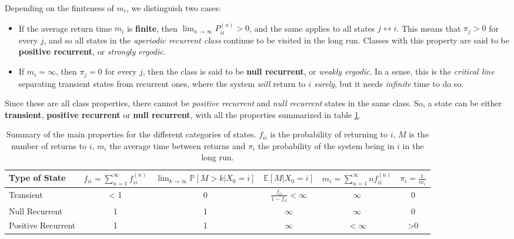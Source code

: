 \documentclass[../template.tex]{subfiles}
\begin{document}
Depending on the finiteness of $m_i$, we distinguish two cases:
\begin{itemize}
    \item If the average return time $m_i$ is \textbf{finite}, then $\lim_{n \to \infty} P_{i i}^{(n)} > 0$, and the same applies to all states $j \leftrightarrow i$. This means that $\pi_j > 0$ for every $j$, and so all states in the \textit{aperiodic recurrent class} continue to be visited in the long run. Classes with this property are said to be \textbf{positive recurrent}, or \textit{strongly ergodic}.
    \item If $m_i = \infty$, then $\pi_j = 0$ for every $j$, then the class is said to be \textbf{null recurrent}, or \textit{weakly ergodic}. In a sense, this is the \textit{critical line} separating transient states from recurrent ones, where the system \textit{will} return to $i$ \textit{surely}, but it needs \textit{infinite} time to do so.        
\end{itemize}
Since these are all class properties, there cannot be \textit{positive recurrent} and \textit{null recurrent} states in the same class. So, a state can be either \textbf{transient}, \textbf{positive recurrent} or \textbf{null recurrent}, with all the properties summarized in table \ref{tab:state-classification}.


\begin{table}[hbp]
    \begin{adjustwidth}{-5em}{-10em}
        \begin{center}
            \begin{tabular}{@{}lccccc@{}}
                \toprule
                \textbf{Type of State} & $\displaystyle f_{i i} = \sum_{n=1}^\infty f_{i i}^{(n)}$ & $\displaystyle \lim_{k \to \infty} \mathbb{P}[M > k|X_0 = i]$ & $\displaystyle \mathbb{E}[M|X_0 = i]$ & $\displaystyle m_i = \sum_{n=1}^{\infty} n f_{i i}^{(n)}$ & $\displaystyle \pi_i = \frac{1}{m_i} $ \\ \midrule
                \footnotesize Transient & 
                < 1 & 0 & $\frac{f_{i i}}{1- f_{i i}} < \infty$ & $\infty$ & 0\\
            \footnotesize Null Recurrent & 1 & 1 & $\infty$ & $\infty$ & 0 \\
            \footnotesize Positive Recurrent & 1 & 1 & $\infty$ & $< \infty$ & \textgreater0\\
                \bottomrule
            \end{tabular}
        \end{center}
    \end{adjustwidth}
    \caption{Summary of the main properties for the different categories of states. $f_{i i}$ is the probability of returning to $i$, $M$ is the number of returns to $i$, $m_i$ the average time between returns and $\pi_i$ the probability of the system being in $i$ in the long run.}
    \label{tab:state-classification}
\end{table}
\end{document}
